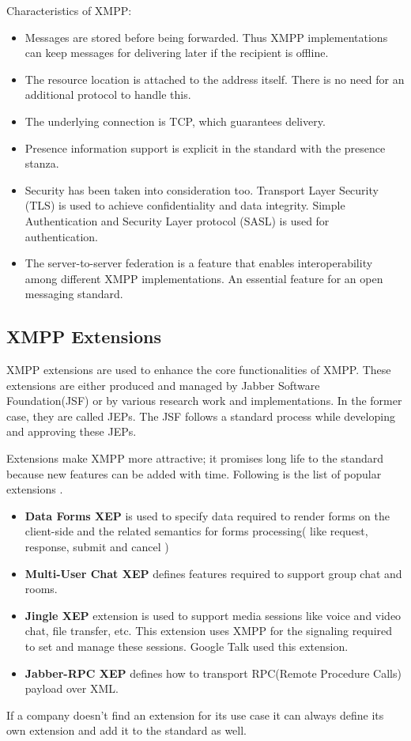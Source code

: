 \documentclass[11pt, conference, a4paper]{IEEEtran}
\begin{document}
\par
Characteristics of XMPP:
\begin{itemize}
    \item Messages are stored before being forwarded. Thus XMPP implementations can keep messages for delivering later if the recipient is offline.
    \item The resource location is attached to the address itself. There is no need for an additional protocol to handle this.
    \item The underlying connection is TCP, which guarantees delivery.
    \item Presence information support is explicit in the standard with the presence stanza.
    \item Security has been taken into consideration too. Transport Layer Security (TLS) is used to achieve confidentiality and data integrity. Simple Authentication and Security Layer protocol (SASL) is used for authentication.
    \item The server-to-server federation is a feature that enables interoperability among different XMPP implementations. An essential feature for an open messaging standard.
\end{itemize}

\subsection{XMPP Extensions}
XMPP extensions are used to enhance the core functionalities of XMPP. These extensions are either produced and managed by Jabber Software Foundation(JSF) or by various research work and implementations. In the former case, they are called JEPs. The JSF follows a standard process while developing and approving these JEPs.
\par
Extensions make XMPP more attractive; it promises long life to the standard because new features can be added with time. Following is the list of popular extensions \cite{xmppEXT}.
\begin{itemize}
\item \textbf{Data Forms XEP} is used to specify data required to render forms on the client-side and the related semantics for forms processing( like request, response, submit and cancel )
\item \textbf{Multi-User Chat XEP} defines features required to support group chat and rooms. 
\item \textbf{Jingle XEP} extension is used to support media sessions like voice and video chat, file transfer, etc. This extension uses XMPP for the signaling required to set and manage these sessions. Google Talk used this extension. 
\item \textbf{Jabber-RPC XEP} defines how to transport RPC(Remote Procedure Calls) payload over XML. 
\end{itemize}
If a company doesn’t find an extension for its use case it can always define its own extension and add it to the standard as well. 
\end{document}
